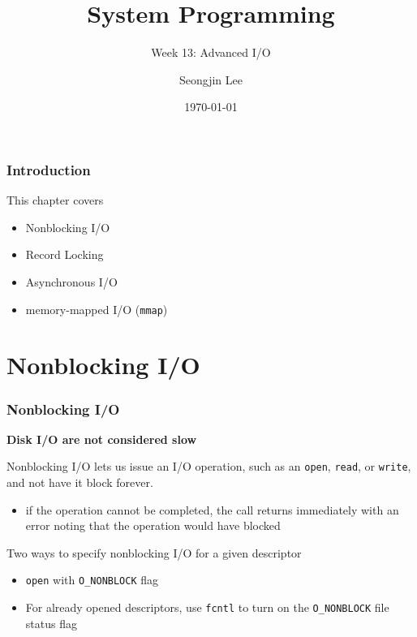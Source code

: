 \documentclass[newPxFont,sthlmFooter,nooffset]{beamer}
\title{System Programming}
\subtitle{Week 13: Advanced I/O}
\author[SJL]{Seongjin Lee}
\institute{\href{mailto:insight@gnu.ac.kr}{insight@gnu.ac.kr}\\\url{http://open.gnu.ac.kr}\\Systems Research Lab.\\Gyeongsang National University}
\date{\today}
\begin{document}
\frame[plain]{\titlepage} 






\begin{frame}[t]
  \frametitle{Introduction}
This chapter covers
\begin{itemize}
\item Nonblocking I/O
\item Record Locking
\item Asynchronous I/O
\item memory-mapped I/O (\texttt{mmap})
\end{itemize}
\end{frame}

\section{Nonblocking I/O}

\begin{frame}[t]
  \frametitle{Nonblocking I/O}

\textbf{Disk I/O are not considered slow}
\bigskip

Nonblocking I/O lets us issue an I/O operation, such as an \texttt{open}, \texttt{read}, or \texttt{write}, and not have it block forever.
\begin{itemize}
\item if the operation cannot be completed, the call returns immediately with an error noting that the operation would have blocked
\end{itemize}

\bigskip
Two ways to specify nonblocking I/O for a given descriptor
\begin{itemize}
\item \texttt{open} with \texttt{O\_NONBLOCK} flag
\item For already opened descriptors, use \texttt{fcntl} to turn on the \texttt{O\_NONBLOCK} file status flag
\end{itemize}
\end{frame}
\end{document}
